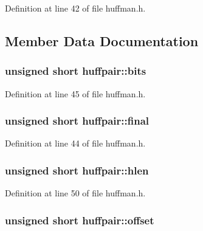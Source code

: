 Definition at line 42 of file huffman.\+h.



\subsection{Member Data Documentation}
\subsubsection[{\texorpdfstring{bits}{bits}}]{\setlength{\rightskip}{0pt plus 5cm}unsigned short huffpair\+::bits}\hypertarget{unionhuffpair_ae97f3f46cad5db8e4fc9805cfe6735c6}{}\label{unionhuffpair_ae97f3f46cad5db8e4fc9805cfe6735c6}


Definition at line 45 of file huffman.\+h.

\subsubsection[{\texorpdfstring{final}{final}}]{\setlength{\rightskip}{0pt plus 5cm}unsigned short huffpair\+::final}\hypertarget{unionhuffpair_ac234f59dfd640386a834b50ec5d88faf}{}\label{unionhuffpair_ac234f59dfd640386a834b50ec5d88faf}


Definition at line 44 of file huffman.\+h.

\subsubsection[{\texorpdfstring{hlen}{hlen}}]{\setlength{\rightskip}{0pt plus 5cm}unsigned short huffpair\+::hlen}\hypertarget{unionhuffpair_a59979d160014121c644c34ac85af33e9}{}\label{unionhuffpair_a59979d160014121c644c34ac85af33e9}


Definition at line 50 of file huffman.\+h.

\subsubsection[{\texorpdfstring{offset}{offset}}]{\setlength{\rightskip}{0pt plus 5cm}unsigned short huffpair\+::offset}\hypertarget{unionhuffpair_ae5ea708b955fee7006f6c6caa387bff9}{}\label{unionhuffpair_ae5ea708b955fee7006f6c6caa387bff9}


